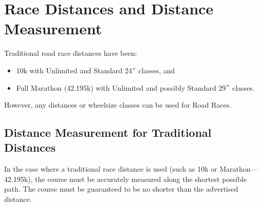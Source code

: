 \section{Race Distances and Distance Measurement}
Traditional road race distances have been: 
\begin{itemize}
\item 10k with Unlimited and Standard 24$"$ classes, and 
\item Full Marathon (42.195k) with Unlimited and possibly Standard 29$"$ classes.
\end{itemize}
However, any distances or wheelsize classes can be used for Road Races.

\subsection {Distance Measurement for Traditional Distances}
In the case where a traditional race distance is used (such as 10k or Marathon---42.195k), the course must be accurately measured along the shortest possible path.
The course must be guaranteed to be no shorter than the advertised distance.

